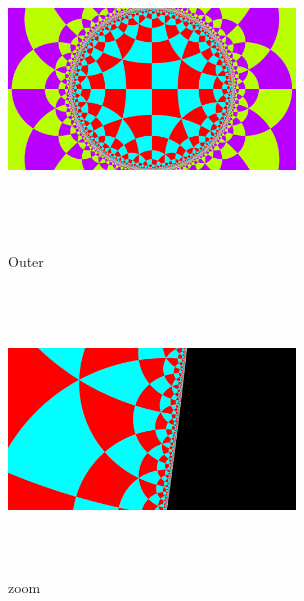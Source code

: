 \begin{figure}[htbp]
  \begin{minipage}{0.49\hsize}
   \center
   \includegraphics[width=3in, height=3in, keepaspectratio]{../img/tessellation/outer.pdf}
   \caption{Outer}
   \label{fig:outer}
  \end{minipage}
 \hspace*{\fill}
 \begin{minipage}{0.49\hsize}
  \center
  \includegraphics[width=3in, height=3in, keepaspectratio]{../img/tessellation/zoom.pdf}
  \caption{zoom}
  \label{fig:zoom}
 \end{minipage}
\end{figure}

